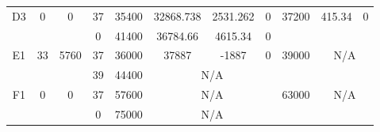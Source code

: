 \begin{sidewaystable}
\begin{tabular}{c||c|c||c|c|c|c|c||c|c|c}
         &
        
      \\
      \hline
      \multirow{2}{*}{D3} &
      \multirow{2}{*}{0} &
      \multirow{2}{*}{0} &
      37 &
      35400 &
        32868.738 &
        2531.262 &
        0 &
      \multirow{2}{*}{37200} &
        \multirow{2}{*}{415.34} &
        \multirow{2}{*}{0}
      \\
      \cline{4-8}
       &
       &
       &
      0 &
      41400 &
        36784.66 &
        4615.34 &
        0 &
      
         &
        
      \\
      \hline
      \multirow{2}{*}{E1} &
      \multirow{2}{*}{33} &
      \multirow{2}{*}{5760} &
      37 &
      36000 &
        37887 &
        -1887 &
        0 &
      \multirow{2}{*}{39000} &
        \multicolumn{2}{c}{\multirow{2}{*}{N/A}}
      \\
      \cline{4-8}
       &
       &
       &
      39 &
      44400 &
        \multicolumn{3}{|c||}{N/A} &
      
        
      \\
      \hline
      \multirow{2}{*}{F1} &
      \multirow{2}{*}{0} &
      \multirow{2}{*}{0} &
      37 &
      57600 &
        \multicolumn{3}{|c||}{N/A} &
      \multirow{2}{*}{63000} &
        \multicolumn{2}{c}{\multirow{2}{*}{N/A}}
      \\
      \cline{4-8}
       &
       &
       &
      0 &
      75000 &
        \multicolumn{3}{|c||}{N/A} &
      
        
      \\
\end{tabular}
\label{table:RDS1-996.tex} 
\end{sidewaystable}
